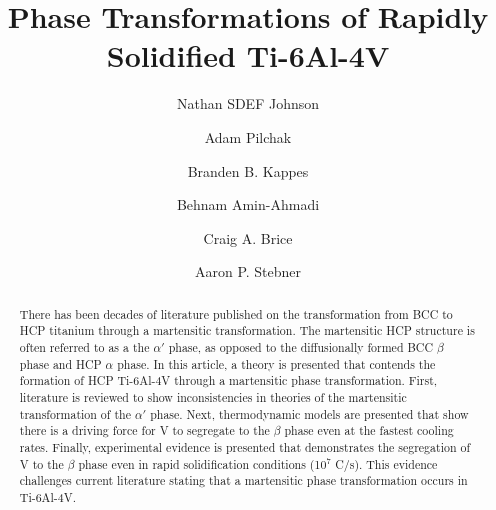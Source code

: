 \documentclass[nofootinbib,notitlepage]{revtex4-1}
\begin{document}
\title{Phase Transformations of Rapidly Solidified Ti-6Al-4V}
\author{Nathan SDEF Johnson}

\author{Adam Pilchak}

\author{Branden B. Kappes}

\author{Behnam Amin-Ahmadi}

\author{Craig A. Brice}

\author{Aaron P. Stebner}

\begin{abstract}
There has been decades of literature published on the transformation from BCC to HCP titanium through a martensitic transformation. The martensitic HCP structure is often referred to as a the $\alpha'$ phase, as opposed to the diffusionally formed BCC $\beta$ phase and HCP $\alpha$ phase. In this article, a theory is presented that contends the formation of HCP Ti-6Al-4V through a martensitic phase transformation. First, literature is reviewed to show inconsistencies in theories of the martensitic transformation of the $\alpha'$ phase. Next, thermodynamic models are presented that show there is a driving force for V to segregate to the $\beta$ phase even at the fastest cooling rates. Finally, experimental evidence is presented that demonstrates the segregation of V to the $\beta$ phase even in rapid solidification conditions (10$^7$ C/s). This evidence challenges current literature stating that a martensitic phase transformation occurs in Ti-6Al-4V.
\end{abstract}
\maketitle
\end{document}

